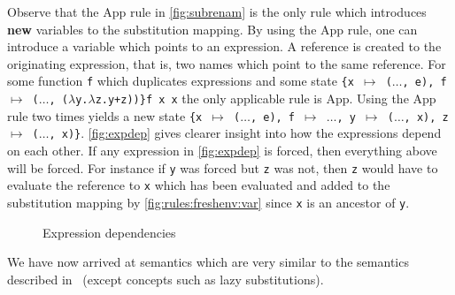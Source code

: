 \documentclass[11pt,oneside,a4paper]{report}
\begin{document}
Observe that the App rule in \autoref{fig:subrenam} is the only rule which introduces \textbf{new} variables to the substitution mapping.
By using the App rule, one can introduce a variable which points to an expression.
A reference is created to the originating expression, that is, two names which point to the same reference.
For some function \texttt{f} which duplicates expressions and some state \texttt{\{x $\mapsto$ ($\dots$, e), f $\mapsto$ ($\dots$, ($\lambda$y.$\lambda$z.y+z))\}f x x} the only applicable rule is App.
Using the App rule two times yields a new state \texttt{\{x $\mapsto$ ($\dots$, e), f $\mapsto$ $\dots$, y $\mapsto$ ($\dots$, x), z $\mapsto$ ($\dots$, x)\}}.
\autoref{fig:expdep} gives clearer insight into how the expressions depend on each other.
If any expression in \autoref{fig:expdep} is forced, then everything above will be forced.
For instance if \texttt{y} was forced but \texttt{z} was not, then \texttt{z} would have to evaluate the reference to \texttt{x} which has been evaluated and added to the substitution mapping by \autoref{fig:rules:freshenv:var} since \texttt{x} is an ancestor of \texttt{y}.
\begin{figure}
  \centering
  \caption{Expression dependencies}
  \label{fig:expdep}
\end{figure}
We have now arrived at semantics which are very similar to the semantics described in~\cite{launchbury1993natural} (except concepts such as lazy substitutions).
\end{document}
